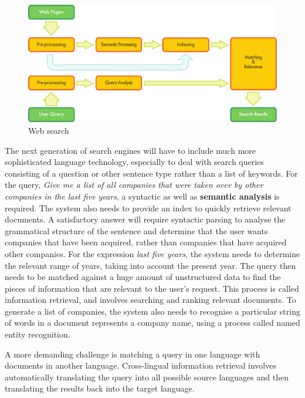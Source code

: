 \begin{multicols}{2}
\begin{figure}[htb]
  \center
  \includegraphics[width=\textwidth]{../_media/english/web_search_architecture}
  \caption{Web search}
  \label{fig:websearcharch_en}
 \end{figure}


The next generation of search engines will have to include much more sophisticated language technology, especially to deal with search queries consisting of a question or other sentence type rather than a list of keywords. For the query, \textit{Give me a list of all companies that were taken over by other companies in the last five years}, a syntactic as well as \textbf{semantic analysis} is required. The system also needs to provide an index to quickly retrieve relevant documents. A satisfactory answer will require syntactic parsing to analyse the grammatical structure of the sentence and determine that the user wants companies that have been acquired, rather than companies that have acquired other companies. For the expression \textit{last five years}, the system needs to determine the relevant range of years, taking into account the present year. The query then needs to be matched against a huge amount of unstructured data to find the pieces of information that are relevant to the user’s request. This process is called information retrieval, and involves searching and ranking relevant documents. To generate a list of companies, the system also needs to recognise a particular string of words in a document represents a company name, using a process called named entity recognition. 

A more demanding challenge is matching a query in one language with documents in another language. Cross-lingual information retrieval involves automatically translating the query into all possible source languages and then translating the results back into the target language. 


\end{multicols}
